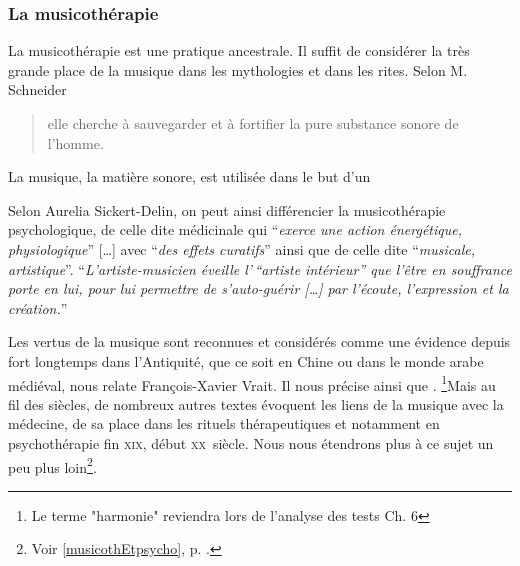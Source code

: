 \subsubsection{La musicothérapie}
La musicothérapie est une pratique ancestrale. Il suffit de considérer la très 
grande  place de la musique dans les mythologies et dans les rites.  Selon M. 
Schneider \blockquote{elle cherche à sauvegarder et à fortifier la pure 
substance sonore de l'homme\autocite[Voir tome I, pp. 202--203]%
	[M. Schneider, <<Le rôle  de la musique dans la mythologie et les rites 
des civilisations non européennes>>]{schaeffner.ea:histoire}.}

La musique, la matière sonore, est utilisée dans le but d'un 

 Selon Aurelia Sickert-Delin, on peut ainsi différencier la musicothérapie 
psychologique, de celle dite médicinale qui \enquote{\emph{exerce une action 
énergétique, physiologique}} [\dots] avec \enquote{\emph{des effets curatifs}}  
ainsi que de celle dite \enquote{\emph{musicale, artistique}}.
 \enquote{\emph{L'artiste-musicien éveille l'\,``artiste intérieur'' que l'être 
en souffrance porte en lui, pour lui permettre de s'auto-guérir [\dots] par 
l'écoute, l'expression et la création.}}\autocite[ch. 1,  p. 14, du texte 
inédit communiqué par A. Sickert-Delin, musicothérapeute à Alersheim, rapporté à J. 
Viret]{viret:b}
 	 
 	 
Les vertus de la musique sont reconnues et considérés comme une évidence depuis 
fort longtemps dans l'Antiquité, que ce soit en Chine ou dans le monde arabe 
médiéval, nous relate François-Xavier Vrait.  
 Il nous précise ainsi que \autocite[ch. III, p. 
96]{vrait_musicotherapie_2018}. \footnote{Le terme "harmonie" reviendra lors de l'analyse des tests Ch. 6}Mais au fil des siècles, de nombreux autres 
textes évoquent les liens de la musique avec la médecine, de sa place dans les 
rituels thérapeutiques et notamment en psychothérapie fin \textsc{xix}\ieme, 
début \textsc{xx}\ieme\ siècle. Nous nous étendrons plus à ce sujet un peu plus 
loin\footnote{Voir \ref{musicothEtpsycho}, p. \pageref{musicothEtpsycho}.}.
 
